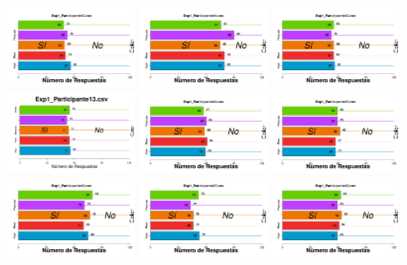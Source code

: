 \documentclass[a4paper ]{article}
\begin{document}
\begin{figure}[th]
\includegraphics[width=0.3\textwidth]{Figures/BiasColor_Exp1_P10} \includegraphics[width=0.3\textwidth]{Figures/BiasColor_Exp1_P11} \includegraphics[width=0.3\textwidth]{Figures/BiasColor_Exp1_P12}
\includegraphics[width=0.3\textwidth]{Figures/BiasColor_Exp1_P13} \includegraphics[width=0.3\textwidth]{Figures/BiasColor_Exp1_P14} \includegraphics[width=0.3\textwidth]{Figures/BiasColor_Exp1_P15}
\includegraphics[width=0.3\textwidth]{Figures/BiasColor_Exp1_P16} \includegraphics[width=0.3\textwidth]{Figures/BiasColor_Exp1_P17} \includegraphics[width=0.3\textwidth]{Figures/BiasColor_Exp1_P18}

\end{figure}
\end{document}
